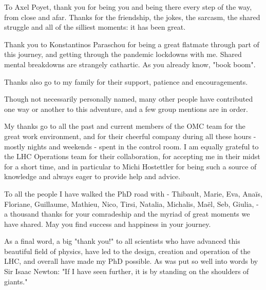 \begin{acknowledgements}
To Axel Poyet, thank you for being you and being there every step of the way, from close and afar.
Thanks for the friendship, the jokes, the sarcasm, the shared struggle and all of the silliest moments: it has been great.

Thank you to Konstantinos Paraschou for being a great flatmate through part of this journey, and getting through the pandemic lockdowns with me.
Shared mental breakdowns are strangely cathartic.
As you already know, "book boom".

Thanks also go to my family for their support, patience and encouragements.
\newline

Though not necessarily personally named, many other people have contributed one way or another to this adventure, and a few group mentions are in order.
\newline

My thanks go to all the past and current members of the OMC team for the great work environment, and for their cheerful company during all these hours - mostly nights and weekends - spent in the control room.
I am equally grateful to the LHC Operations team for their collaboration, for accepting me in their midst for a short time, and in particular to Michi Hostettler for being such a source of knowledge and always eager to provide help and advice.

To all the people I have walked the PhD road with - Thibault, Marie, Eva, Anaïs, Floriane, Guillaume, Mathieu, Nico, Tirsi, Natalia, Michalis, Maël, Seb, Giulia, - a thousand thanks for your comradeship and the myriad of great moments we have shared.
May you find success and happiness in your journey.

As a final word, a big "thank you!" to all scientists who have advanced this beautiful field of physics, have led to the design, creation and operation of the LHC, and overall have made my PhD possible.
As was put so well into words by Sir Isaac Newton: "If I have seen further, it is by standing on the shoulders of giants."

\end{acknowledgements}